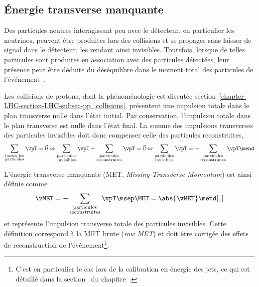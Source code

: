 \subsection{Énergie transverse manquante}\label{chapter-LHC-section-evt_reco-subsec-MET}
Des particules neutres interagissant peu avec le détecteur, en particulier les neutrinos, peuvent être produites lors des collisions et se propager sans laisser de signal dans le détecteur, les rendant ainsi invisibles.
Toutefois, lorsque de telles particules sont produites en association avec des particules détectées, leur présence peut être déduite du déséquilibre dans le moment total des particules de l'événement~\cite{CMS-PAS-JME-17-001}.
\par Les collisions de protons, dont la phénoménologie est discutée section~\ref{chapter-LHC-section-LHC-subsec-pp_collisions}, présentent une impulsion totale dans le plan transverse nulle dans l'état initial.
Par conservation, l'impulsion totale dans le plan transverse est nulle dans l'état final.
La somme des impulsions transverses des particules invisibles doit donc compenser celle des particules reconstruites, \ie
\begin{equation}
\sum_{\substack{\text{toutes les}\\\text{particules}}} \vpT = \vec{0}
\Leftrightarrow
\sum_{\substack{\text{particules}\\\text{invisibles}}} \vpT + \sum_{\substack{\text{particules}\\\text{reconstruites}}} \vpT = \vec{0}
\Leftrightarrow
\sum_{\substack{\text{particules}\\\text{invisibles}}} \vpT = -\sum_{\substack{\text{particules}\\\text{reconstruites}}} \vpT \mend
\end{equation}
\par L'énergie transverse manquante (MET, \emph{Missing Transverse Momentum}) est ainsi définie comme
\begin{equation}
\vMET = -\sum_{\substack{\text{particules}\\\text{reconstruites}}} \vpT
\msep
\MET = \abs{\vMET}
\mend[,]
\end{equation}
et représente l'impulsion transverse totale des particules invisibles.
Cette définition correspond à la MET \og brute \fg{} (\emph{raw MET}) et doit être corrigée des effets de reconstruction de l'événement\footnote{C'est en particulier le cas lors de la calibration en énergie des jets, ce qui est détaillé dans la section~ du chapitre~.}.